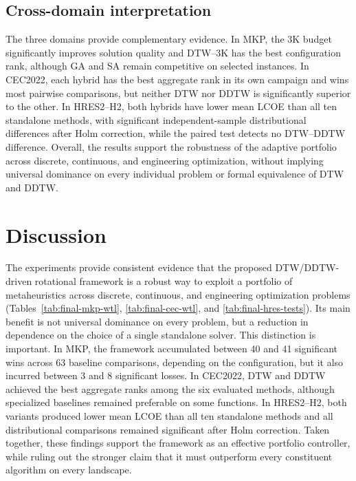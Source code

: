 \documentclass[review]{elsarticle}
\begin{document}
\subsection{Cross-domain interpretation}
\label{sec:final-stat-synthesis}

The three domains provide complementary evidence. In MKP, the 3K budget
significantly improves solution quality and DTW--3K has the best configuration
rank, although GA and SA remain competitive on selected instances. In
CEC2022, each hybrid has the best aggregate rank in its own campaign and wins
most pairwise comparisons, but neither DTW nor DDTW is significantly superior
to the other. In HRES2--H2, both hybrids have lower mean LCOE than all ten
standalone methods, with significant independent-sample distributional
differences after Holm correction, while the paired test detects no
DTW--DDTW difference.
Overall, the results support the robustness of the adaptive portfolio across
discrete, continuous, and engineering optimization, without implying universal
dominance on every individual problem or formal equivalence of DTW and DDTW.












\section{Discussion}
\label{sec:discussion-final}

The experiments provide consistent evidence that the proposed
DTW/DDTW-driven rotational framework is a robust way to exploit a portfolio of
metaheuristics across discrete, continuous, and engineering optimization
problems (Tables~\ref{tab:final-mkp-wtl}, \ref{tab:final-cec-wtl}, and
\ref{tab:final-hres-tests}). Its main benefit is not universal dominance on every problem, but a
reduction in dependence on the choice of a single standalone solver. This
distinction is important. In MKP, the framework accumulated between 40 and 41
significant wins across 63 baseline comparisons, depending on the
configuration, but it also incurred between 3 and 8 significant losses. In
CEC2022, DTW and DDTW achieved the best aggregate ranks among the six evaluated
methods, although specialized baselines remained preferable on some functions.
In HRES2--H2, both variants produced lower mean LCOE than all ten standalone
methods and all distributional comparisons remained significant after Holm
correction. Taken together, these findings support the framework as an
effective portfolio controller, while ruling out the stronger claim that it
must outperform every constituent algorithm on every landscape.
\end{document}
